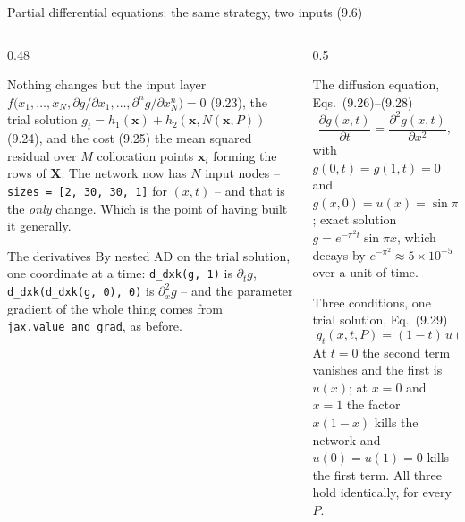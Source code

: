 \documentclass[10pt,aspectratio=169]{beamer}
\begin{document}
\begin{frame}{Partial differential equations: the same strategy, two inputs (9.6)}
\small
\begin{columns}[T]
\begin{column}{0.48\textwidth}
\begin{block}{Nothing changes but the input layer}
\footnotesize
$f\bigl(x_1,\dots,x_N,\partial g/\partial x_1,\dots,\partial^{n}g/\partial
x_N^{n}\bigr)=0$ (9.23), the trial solution
$g_t=h_1(\bm{x})+h_2(\bm{x},N(\bm{x},P))$ (9.24), and the cost (9.25) the
mean squared residual over $M$ collocation points $\bm{x}_i$ forming the
rows of $\bm{X}$.  The network now has $N$ input nodes -- \texttt{sizes =
[2, 30, 30, 1]} for $(x,t)$ -- and that is the \emph{only} change.  Which is
the point of having built it generally.
\end{block}
\begin{block}{The derivatives}
\footnotesize
By nested AD on the trial solution, one coordinate at a time:
\texttt{d\_dxk(g, 1)} is $\partial_tg$, \texttt{d\_dxk(d\_dxk(g, 0), 0)}
is $\partial_x^{2}g$ -- and the parameter gradient of the whole thing comes
from \texttt{jax.value\_and\_grad}, as before.
\end{block}
\end{column}
\begin{column}{0.5\textwidth}
\begin{block}{The diffusion equation, Eqs.~(9.26)--(9.28)}
\footnotesize
\[
  \frac{\partial g(x,t)}{\partial t}=\frac{\partial^{2}g(x,t)}{\partial x^{2}},
\]
with $g(0,t)=g(1,t)=0$ and $g(x,0)=u(x)=\sin\pi x$; exact solution
$g=e^{-\pi^{2}t}\sin\pi x$, which decays by $e^{-\pi^{2}}\approx5\times10^{-5}$
over a unit of time.
\end{block}
\begin{block}{Three conditions, one trial solution, Eq.~(9.29)}
\footnotesize
\[
  \boxed{\;g_t(x,t,P)=(1-t)\,u(x)+x(1-x)\,t\,N(x,t,P)\;}
\]
At $t=0$ the second term vanishes and the first is $u(x)$; at $x=0$ and
$x=1$ the factor $x(1-x)$ kills the network and $u(0)=u(1)=0$ kills the
first term.  All three hold identically, for every $P$.
\end{block}
\end{column}
\end{columns}
\end{frame}
\end{document}

